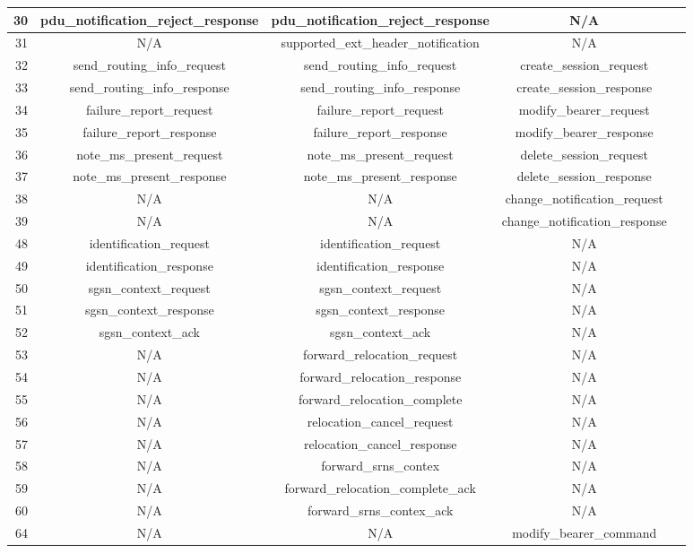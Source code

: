 \documentclass[english]{report}
\begin{document}
\begin{itemize}
\begin{longtable}{|r|c|c|c|p{13.5cm}|}
\hline
30 & pdu\_notification\_reject\_response & pdu\_notification\_reject\_response & N/A\\
\hline
31 & N/A & supported\_ext\_header\_notification & N/A \\
\hline
32 & send\_routing\_info\_request & send\_routing\_info\_request & create\_session\_request \\
\hline
33 & send\_routing\_info\_response & send\_routing\_info\_response & create\_session\_response \\
\hline
34 & failure\_report\_request & failure\_report\_request & modify\_bearer\_request \\
\hline
35 & failure\_report\_response & failure\_report\_response & modify\_bearer\_response \\
\hline
36 & note\_ms\_present\_request & note\_ms\_present\_request & delete\_session\_request \\
\hline
37 & note\_ms\_present\_response & note\_ms\_present\_response & delete\_session\_response \\
\hline
38 & N/A & N/A & change\_notification\_request \\
\hline
39 & N/A & N/A & change\_notification\_response \\
\hline
48 & identification\_request & identification\_request & N/A \\
\hline
49 & identification\_response & identification\_response & N/A \\
\hline
50 & sgsn\_context\_request & sgsn\_context\_request & N/A \\
\hline
51 & sgsn\_context\_response & sgsn\_context\_response & N/A \\
\hline
52 & sgsn\_context\_ack & sgsn\_context\_ack & N/A \\
\hline
53 & N/A & forward\_relocation\_request & N/A \\
\hline
54 & N/A & forward\_relocation\_response & N/A \\
\hline
55 & N/A & forward\_relocation\_complete & N/A \\
\hline
56 & N/A & relocation\_cancel\_request & N/A \\
\hline
57 & N/A & relocation\_cancel\_response & N/A \\
\hline
58 & N/A & forward\_srns\_contex & N/A \\
\hline
59 & N/A & forward\_relocation\_complete\_ack & N/A \\
\hline
60 & N/A & forward\_srns\_contex\_ack & N/A \\
\hline
64 & N/A & N/A & modify\_bearer\_command \\

\end{longtable}
\end{itemize}
\end{document}
